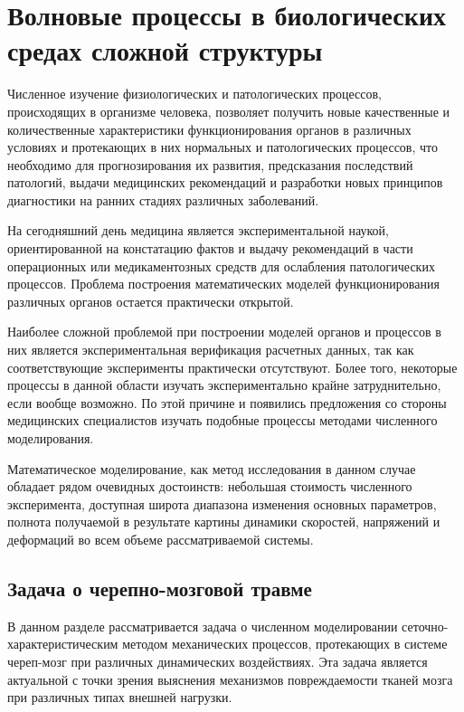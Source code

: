 \section{Волновые процессы в биологических средах сложной структуры}

Численное изучение физиологических и патологических процессов, происходящих в организме человека, позволяет получить новые качественные и количественные характеристики функционирования органов в различных условиях и протекающих в них нормальных и патологических процессов, что необходимо для прогнозирования их развития, предсказания последствий патологий, выдачи медицинских рекомендаций и разработки новых принципов диагностики на ранних стадиях различных заболеваний.

На сегодняшний день медицина является экспериментальной наукой, ориентированной на констатацию фактов и выдачу рекомендаций в части операционных или медикаментозных средств для ослабления патологических процессов. Проблема построения математических моделей функционирования различных органов остается практически открытой.

Наиболее сложной проблемой при построении моделей органов и процессов в них является экспериментальная верификация расчетных данных, так как соответствующие эксперименты практически отсутствуют. Более того, некоторые процессы в данной области изучать экспериментально крайне затруднительно, если вообще возможно. По этой причине и появились предложения со стороны медицинских специалистов изучать подобные процессы методами численного моделирования.

Математическое моделирование, как метод исследования в данном случае обладает рядом очевидных достоинств: небольшая стоимость численного эксперимента, доступная широта диапазона изменения основных параметров, полнота получаемой в результате картины динамики скоростей, напряжений и деформаций во всем объеме рассматриваемой системы.

\clearpage
\newpage

\subsection{Задача о черепно-мозговой травме}

В данном разделе рассматривается задача о численном моделировании сеточно-характеристическим методом механических процессов, протекающих в системе череп-мозг при различных динамических воздействиях. Эта задача является актуальной с точки зрения выяснения механизмов повреждаемости тканей мозга при различных типах внешней нагрузки.

